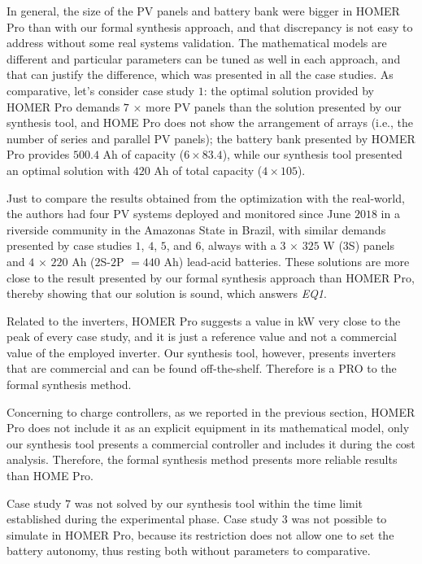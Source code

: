 \documentclass[review]{elsarticle}
\begin{document}
In general, the size of the PV panels and battery bank were 
bigger in HOMER Pro than with our formal synthesis approach, 
and that discrepancy is not easy to address without some real 
systems validation. The mathematical models are different and 
particular parameters can be tuned as well in each approach, 
and that can justify the difference, which was presented in all 
the case studies. As comparative, let's consider case study $1$: 
the optimal solution provided by HOMER Pro demands $7$ $\times$ 
more PV panels than the solution presented by our synthesis tool, 
and HOME Pro does not show the arrangement of arrays 
(i.e., the number of series and parallel PV panels); 
the battery bank presented by HOMER Pro provides $500.4$ Ah 
of capacity ($6 \times 83.4$), while our synthesis tool 
presented an optimal solution with $420$ Ah of total capacity 
($4 \times 105$). 

Just to compare the results obtained from the optimization 
with the real-world, the authors had four PV systems deployed 
and monitored since June $2018$ in a riverside community 
in the Amazonas State in Brazil, with similar demands 
presented by case studies $1$, $4$, $5$, and $6$, 
always with a $3$ $\times$ $325$ W ($3$S) panels and 
$4$ $\times$ $220$ Ah ($2$S-$2$P $= 440$ Ah) 
lead-acid batteries. These solutions are more close 
to the result presented by our formal synthesis 
approach than HOMER Pro, thereby showing that our 
solution is sound, which answers \textit{EQ1}.

Related to the inverters, HOMER Pro suggests a value in 
kW very close to the peak of every case study, and it 
is just a reference value and not a commercial value of 
the employed inverter. Our synthesis tool, however, 
presents inverters that are commercial and can be found 
off-the-shelf. Therefore is a PRO to the formal synthesis method.

Concerning to charge controllers, as we reported in 
the previous section, HOMER Pro does not include it 
as an explicit equipment in its mathematical model, 
only our synthesis tool presents a commercial controller 
and includes it during the cost analysis. Therefore, 
the formal synthesis method presents more reliable results than
HOME Pro.

Case study $7$ was not solved by our synthesis tool 
within the time limit established during the experimental 
phase. Case study $3$ was not possible to simulate in HOMER Pro, 
because its restriction does not allow one to set the battery autonomy, 
thus resting both without parameters to comparative.
\end{document}
